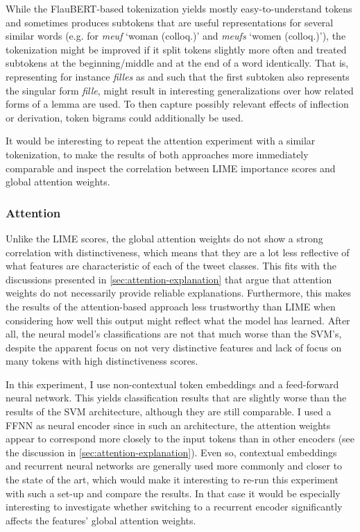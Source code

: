 While the FlauBERT-based tokenization yields mostly easy-to-understand tokens and sometimes produces subtokens that are useful representations for several similar words (e.g.  for \textit{meuf} `woman (colloq.)' and \textit{meufs} `women (colloq.)'), the tokenization might be improved if it split tokens slightly more often and treated subtokens at the beginning/middle and at the end of a word identically.
That is, representing for instance \textit{filles} as  and  such that the first subtoken also represents the singular form \textit{fille}, might result in interesting generalizations over how related forms of a lemma are used.
To then capture possibly relevant effects of inflection or derivation, token bigrams could additionally be used.

It would be interesting to repeat the attention experiment with a similar tokenization, to make the results of both approaches more immediately comparable and inspect the correlation between LIME importance scores and global attention weights.

\subsubsection{Attention}

Unlike the LIME scores, the global attention weights do not show a strong correlation with distinctiveness, which means that they are a lot less reflective of what features are characteristic of each of the tweet classes.
This fits with the discussions presented in \autoref{sec:attention-explanation} that argue that attention weights do not necessarily provide reliable explanations.
Furthermore, this makes the results of the attention-based approach less trustworthy than LIME when considering how well this output might reflect what the model has learned.
After all, the neural model's classifications are not that much worse than the SVM's, despite the apparent focus on not very distinctive features and lack of focus on many tokens with high distinctiveness scores. 

In this experiment, I use non-contextual token embeddings and a feed-forward neural network.
This yields classification results that are slightly worse than the results of the SVM architecture, although they are still comparable.
I used a FFNN as neural encoder since in such an architecture, the attention weights appear to correspond more closely to the input tokens than in other encoders (see the discussion in \autoref{sec:attention-explanation}).
Even so, contextual embeddings and recurrent neural networks are generally used more commonly and closer to the state of the art, which would make it interesting to re-run this experiment with such a set-up and compare the results.
In that case it would be especially interesting to investigate whether switching to a recurrent encoder significantly affects the features' global attention weights.

